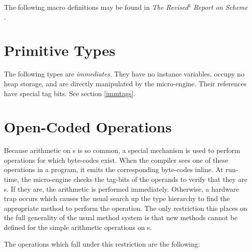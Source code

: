 The following macro definitions may be found in \emph{The Revised$^3$
Report on Scheme} \citep{R3RS}.



\section{Primitive Types}

The following types are \emph{immediates}.  They have no instance
variables, occupy no heap storage, and are directly manipulated by the
micro-engine.  Their references have special tag bits.  See section
\ref{immtags}.



\section{Open-Coded Operations}

Because arithmetic on s is so common, a special mechanism
is used to perform operations for which byte-codes exist.  When the
compiler sees one of these operations in a program, it emits the
corresponding byte-codes inline. At run-time, the micro-engine checks
the tag-bits of the operands to verify that they are s.  If
they are, the arithmetic is performed immediately.  Otherwise, a
hardware trap occurs which causes the usual search up the type
hierarchy to find the appropriate method to perform the operation.
The only restriction this places on the full generality of the usual
method system is that new methods cannot be defined for the simple
arithmetic operations on s.

The operations which fall under this restriction are the following:



